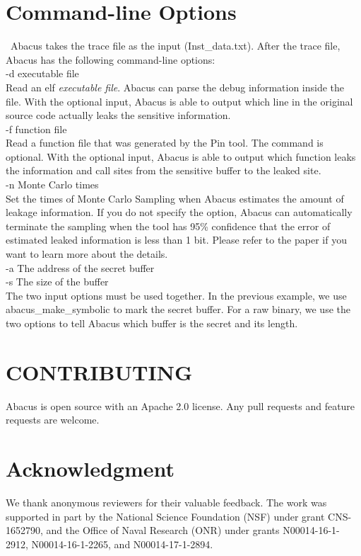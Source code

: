 \documentclass[10pt,conference]{IEEEtran}
\newcommand{\tool}{\textsf{Abacus}}
\begin{document}
\section{Command-line Options}
~\tool{} takes the trace file as the input (\textsf{Inst\_data.txt}). After the trace file, \tool{} has the following command-line options:
\vspace{3pt}
\\\textsf{-d {executable file}}
\\ Read an elf \textit{executable file}. \tool{} can parse the debug information inside the file. With the optional input, \tool{} is able to output which line in the original source code actually leaks the sensitive information.
\vspace{3pt}
\\\textsf{-f {function file}}
\\Read a function file that was generated by the Pin tool. The command is optional. With the optional input, \tool{} is able to output which function leaks the information and call sites from the sensitive buffer to the leaked site.
\vspace{3pt}
\\\textsf{-n {Monte Carlo times}}
\\ Set the times of Monte Carlo Sampling when \tool{} estimates the amount of leakage information. If you do not specify the option, \tool{} can automatically terminate the sampling when the tool has 95\% confidence that the error of estimated leaked information is less than 1 bit. Please refer to the paper if you want to learn more about the details.
\vspace{3pt}
\\\textsf{-a {The address of the secret buffer} \\-s {The size of the buffer}}
\\The two input options must be used together. In the previous example, we use abacus\_make\_symbolic to mark the secret buffer. For a raw binary, we use the two options to tell \tool{} which buffer is the secret and its length.

\section{CONTRIBUTING}
\tool{} is open source with an Apache 2.0 license. Any pull requests and feature requests are welcome.

\section*{Acknowledgment}
We thank anonymous reviewers for their valuable feedback. The work was supported in part by the National Science Foundation (NSF) under grant CNS-1652790, and the Office of Naval Research (ONR) under grants N00014-16-1-2912, N00014-16-1-2265, and N00014-17-1-2894. 




\end{document}
